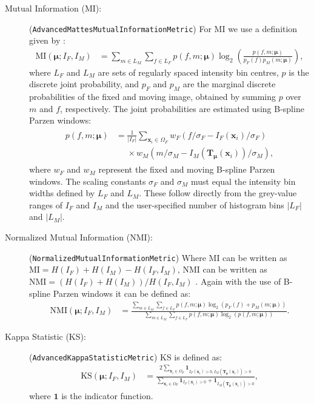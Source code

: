 \documentclass[]{report}
\newcommand{\vx}{\bm{x}}
\newcommand{\vmu}{\bm{\mu}}
\newcommand{\vT}{\bm{T}}
\newcommand{\vTm}{\bm{T}_{\vmu}}
\newcommand\relphantom[1]{\mathrel{\phantom{#1}}}
\begin{document}
\begin{description}
\item[Mutual Information (MI):] (\texttt{AdvancedMattesMutualInformationMetric}) For MI \citep{MaesEA97,ViolaEA97,MattesEA03} we
use a definition given by \citet{ThevenazEA00a}:
\begin{align}
\mathrm{MI}(\vmu; I_F, I_M) &=
 \sum\limits_{m\in L_M} \sum\limits_{f\in L_F}
 p(f,m;\vmu) \log_2
 \left( \frac{ p(f,m;\vmu) }{ p_F(f) p_M(m;\vmu)  }
 \right),\label{eq:MI}
\end{align}
where $L_F$ and $L_M$ are sets of regularly spaced intensity bin
centres, $p$ is the discrete joint probability, and $p_F$ and
$p_M$ are the marginal discrete probabilities of the fixed and
moving image, obtained by summing $p$ over $m$ and $f$,
respectively. The joint probabilities are estimated using B-spline
Parzen windows:
\begin{align}
\begin{split}
 p(f,m;\vmu) &=  \frac{1}{|I_F|} \sum\limits_{\vx_i \in \Omega_F}
 w_F( f/\sigma_F - I_F(\vx_i)/\sigma_F ) \\
 &\relphantom{=}\times w_M( m/\sigma_M - I_M(\vTm(\vx_i))/\sigma_M ),
\end{split} \label{eq:histogram}
\end{align}
where $w_F$ and $w_M$ represent the fixed and moving B-spline
Parzen windows. The scaling constants $\sigma_F$ and $\sigma_M$
must equal the intensity bin widths defined by $L_F$ and $L_M$.
These follow directly from the grey-value ranges of $I_F$ and
$I_M$ and the user-specified number of histogram bins $|L_F|$ and
$|L_M|$.

\item[Normalized Mutual Information (NMI):]
(\texttt{NormalizedMutualInformationMetric}) Where MI can be written
as $\mathrm{MI} = H(I_F) + H(I_M) - H(I_F,I_M)$, NMI can be written
as $\mathrm{NMI} = ( H(I_F) + H(I_M) ) / H(I_F,I_M)$
\cite{Stu99:NMI}. Again with the use of B-spline Parzen windows it
can be defined as:
\begin{align}
\mathrm{NMI}(\vmu; I_F, I_M) &=
 \frac{\sum\limits_{m\in L_M} \sum\limits_{f\in L_F} p(f,m;\vmu) \log_2
 \left( p_F(f) + p_M(m;\vmu) \right)}{ \sum\limits_{m\in L_M} \sum\limits_{f\in L_F}
 p(f,m;\vmu) \log_2 \left( p(f,m;\vmu) \right) }. \label{eq:NMI}
\end{align}

\item[Kappa Statistic (KS):] (\texttt{AdvancedKappaStatisticMetric})
KS is defined as:
\begin{align}
\mathrm{KS}(\vmu;I_F,I_M) &= \frac{ 2 \sum\limits_{\vx_i \in
\Omega_F} \mathbf{1}_{I_F(\vx_i) > 0, I_M(\vT_{\vmu}(\vx_i)) >
0}}{\sum\limits_{\vx_i \in \Omega_F} \mathbf{1}_{I_F(\vx_i) > 0} +
\mathbf{1}_{I_M(\vT_{\vmu}(\vx_i)) > 0}}, \label{eq:KS}
\end{align}
where $\mathbf{1}$ is the indicator function.

\end{description}
\end{document}

